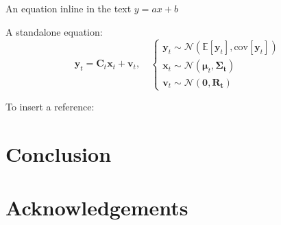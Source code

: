 \documentclass[11pt,twoside]{article}
\begin{document}
An equation inline in the text $y=ax+b$

A standalone equation:
\begin{equation}
\mathbf{y}_{t}=\mathbf{C}_{t}\mathbf{x}_{t}+\mathbf{v}_{t},\quad\left\{\begin{array}{l}
\mathbf{y}_{t}\sim\mathcal{N}(\mathbb{E}[\mathbf{y}_{t}],\text{cov}[\mathbf{y}_{t}])\\[4pt]
\mathbf{x}_{t}\sim\mathcal{N}(\bm{\mu}_{t},\bm{\Sigma_{t}})\\[4pt]
\mathbf{v}_{t}\sim\mathcal{N}(\mathbf{0},\mathbf{R_{t}})
\end{array}\right.
\label{EQ:y}
\end{equation}

To insert a reference: \cite{gelman2014bayesian}


\section{Conclusion}\label{S:Conclusion}


\section*{Acknowledgements}



\end{document}
